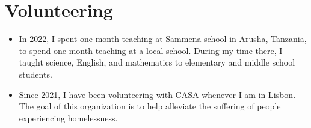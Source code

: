 \documentclass[a4paper,11pt]{article}
\begin{document}
    \vspace{15pt}

      \section{Volunteering}

      \vspace{4pt}
      \begin{itemize}
      \item In 2022, I spent one month teaching at \href{https://www.facebook.com/people/Charity-sammena-school-and-orphanage/100068066163936/}{Sammena school} in Arusha, Tanzania, to spend one month teaching at a local school. During my time there, I taught science, English, and mathematics to elementary and middle school students.
      \item Since 2021, I have been volunteering with \href{https://www.casa-apoioaosemabrigo.org/casa-a-associacao/}{CASA} whenever I am in Lisbon. The goal of this organization is to help alleviate the suffering of people experiencing homelessness. 
      \end{itemize}

      







\end{document}
